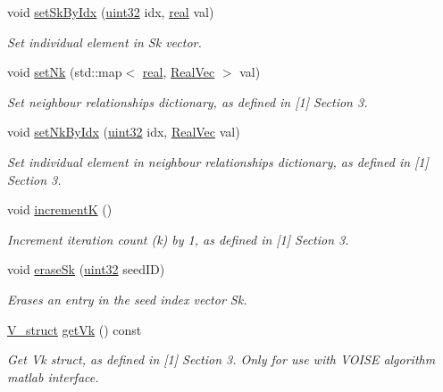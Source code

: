 \begin{DoxyCompactItemize}
void \mbox{\hyperlink{classvd_a578ca6980896563397214c584401c7f5}{set\+Sk\+By\+Idx}} (\mbox{\hyperlink{typedefs_8h_a8ad23e2333787a214e20a58a284a5a60}{uint32}} idx, \mbox{\hyperlink{typedefs_8h_a58a0c7cf2501f4492da833421be92547}{real}} val)
\begin{DoxyCompactList}\small\item\em Set individual element in Sk vector. \end{DoxyCompactList}\item 
void \mbox{\hyperlink{classvd_aa1a3d9448f6ff6f8076b15c9e9a63d7e}{set\+Nk}} (std\+::map$<$ \mbox{\hyperlink{typedefs_8h_a58a0c7cf2501f4492da833421be92547}{real}}, \mbox{\hyperlink{typedefs_8h_a84b6d9a0fbb45e01ad4a3aa5667f2992}{Real\+Vec}} $>$ val)
\begin{DoxyCompactList}\small\item\em Set neighbour relationships dictionary, as defined in \mbox{[}1\mbox{]} Section 3. \end{DoxyCompactList}\item 
void \mbox{\hyperlink{classvd_aa45da38425cbd5b48f61313323ba6204}{set\+Nk\+By\+Idx}} (\mbox{\hyperlink{typedefs_8h_a8ad23e2333787a214e20a58a284a5a60}{uint32}} idx, \mbox{\hyperlink{typedefs_8h_a84b6d9a0fbb45e01ad4a3aa5667f2992}{Real\+Vec}} val)
\begin{DoxyCompactList}\small\item\em Set individual element in neighbour relationships dictionary, as defined in \mbox{[}1\mbox{]} Section 3. \end{DoxyCompactList}\item 
void \mbox{\hyperlink{classvd_a59c1f5756af7de9cc7a0089221cbd5b7}{incrementK}} ()
\begin{DoxyCompactList}\small\item\em Increment iteration count (k) by 1, as defined in \mbox{[}1\mbox{]} Section 3. \end{DoxyCompactList}\item 
void \mbox{\hyperlink{classvd_a0542124682b77128935d62210a9c86fe}{erase\+Sk}} (\mbox{\hyperlink{typedefs_8h_a8ad23e2333787a214e20a58a284a5a60}{uint32}} seed\+ID)
\begin{DoxyCompactList}\small\item\em Erases an entry in the seed index vector Sk. \end{DoxyCompactList}\item 
\mbox{\hyperlink{structV__struct}{V\+\_\+struct}} \mbox{\hyperlink{classvd_a090bebdbbff36888934c870daf3dcb36}{get\+Vk}} () const
\begin{DoxyCompactList}\small\item\em Get Vk struct, as defined in \mbox{[}1\mbox{]} Section 3. Only for use with V\+O\+I\+SE algorithm matlab interface. \end{DoxyCompactList}\item 

\end{DoxyCompactItemize}
